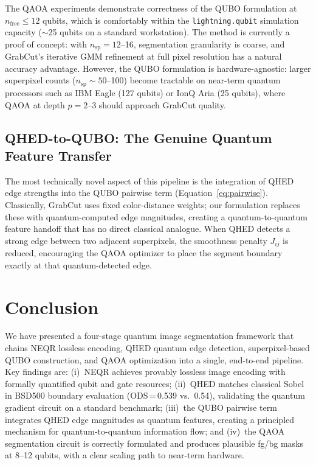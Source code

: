\documentclass[journal]{IEEEtran}
\begin{document}
The QAOA experiments demonstrate correctness of the QUBO formulation at
$n_{\text{free}} \leq 12$ qubits, which is comfortably within the
\texttt{lightning.qubit} simulation capacity ($\sim$25 qubits on a standard
workstation).  The method is currently a proof of concept: with
$n_{\text{sp}} = 12$--16, segmentation granularity is coarse, and GrabCut's
iterative GMM refinement at full pixel resolution has a natural accuracy
advantage.  However, the QUBO formulation is hardware-agnostic: larger
superpixel counts ($n_{\text{sp}} \sim 50$--100) become tractable on
near-term quantum processors such as IBM Eagle (127 qubits) or IonQ Aria
(25 qubits), where QAOA at depth $p = 2$--3 should approach GrabCut quality.

\subsection{QHED-to-QUBO: The Genuine Quantum Feature Transfer}

The most technically novel aspect of this pipeline is the integration of
QHED edge strengths into the QUBO pairwise term (Equation~\ref{eq:pairwise}).
Classically, GrabCut uses fixed color-distance weights; our formulation
replaces these with quantum-computed edge magnitudes, creating a
quantum-to-quantum feature handoff that has no direct classical analogue.
When QHED detects a strong edge between two adjacent superpixels, the
smoothness penalty $J_{ij}$ is reduced, encouraging the QAOA optimizer to
place the segment boundary exactly at that quantum-detected edge.

\section{Conclusion}
\label{sec:conclusion}

We have presented a four-stage quantum image segmentation framework that
chains NEQR lossless encoding, QHED quantum edge detection, superpixel-based
QUBO construction, and QAOA optimization into a single, end-to-end pipeline.
Key findings are: (i)~NEQR achieves provably lossless image encoding with
formally quantified qubit and gate resources; (ii)~QHED matches classical Sobel
in BSD500 boundary evaluation (ODS\,=\,0.539 vs.\ 0.54), validating the
quantum gradient circuit on a standard benchmark; (iii)~the QUBO pairwise
term integrates QHED edge magnitudes as quantum features, creating a
principled mechanism for quantum-to-quantum information flow; and (iv)~the
QAOA segmentation circuit is correctly formulated and produces plausible
fg/bg masks at 8--12 qubits, with a clear scaling path to near-term hardware.
\end{document}
